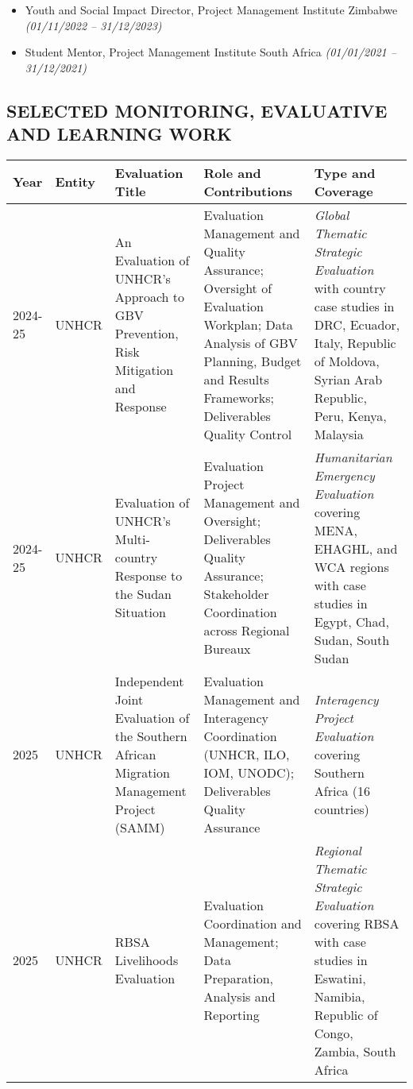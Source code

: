 \documentclass[
  10pt,
]{article}
\begin{document}
\begin{itemize}[itemsep=0.25em, topsep=0.25em]
  \item Youth and Social Impact Director, Project Management Institute Zimbabwe \textit{(01/11/2022 – 31/12/2023)}
  \item Student Mentor, Project Management Institute South Africa \textit{(01/01/2021 – 31/12/2021)}
\end{itemize}

\clearpage
\begin{landscape}

\section{SELECTED MONITORING, EVALUATIVE AND LEARNING WORK}
\begin{tabularx}{\linewidth}{|l|l|X|X|X|}
\hline
\textbf{Year} & \textbf{Entity} & \textbf{Evaluation Title} & \textbf{Role and Contributions} & \textbf{Type and Coverage} \\
\hline
2024-25 & UNHCR & An Evaluation of UNHCR's Approach to GBV Prevention, Risk Mitigation and Response & Evaluation Management and Quality Assurance; Oversight of Evaluation Workplan; Data Analysis of GBV Planning, Budget and Results Frameworks; Deliverables Quality Control & \emph{Global Thematic Strategic Evaluation} with country case studies in DRC, Ecuador, Italy, Republic of Moldova, Syrian Arab Republic, Peru, Kenya, Malaysia \\
\hline
2024-25 & UNHCR & Evaluation of UNHCR's Multi-country Response to the Sudan Situation & Evaluation Project Management and Oversight; Deliverables Quality Assurance; Stakeholder Coordination across Regional Bureaux & \emph{Humanitarian Emergency Evaluation} covering MENA, EHAGHL, and WCA regions with case studies in Egypt, Chad, Sudan, South Sudan \\
\hline
2025 & UNHCR & Independent Joint Evaluation of the Southern African Migration Management Project (SAMM) & Evaluation Management and Interagency Coordination (UNHCR, ILO, IOM, UNODC); Deliverables Quality Assurance & \emph{Interagency Project Evaluation} covering Southern Africa (16 countries) \\
\hline
2025 & UNHCR & RBSA Livelihoods Evaluation & Evaluation Coordination and Management; Data Preparation, Analysis and Reporting & \emph{Regional Thematic Strategic Evaluation} covering RBSA with case studies in Eswatini, Namibia, Republic of Congo, Zambia, South Africa \\

\end{tabularx}
\end{landscape}
\end{document}
